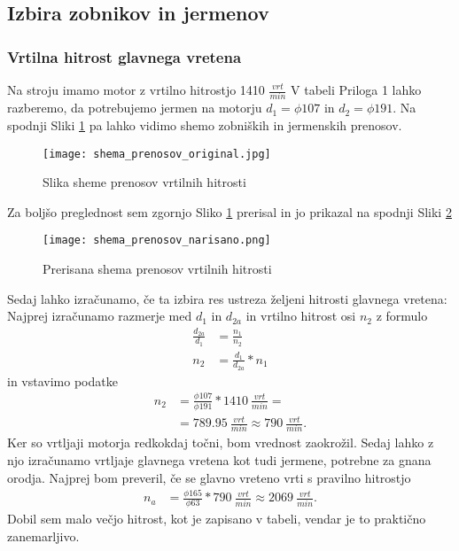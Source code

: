 \subsection{Izbira zobnikov in jermenov}
\subsubsection{Vrtilna hitrost glavnega vretena}
Na stroju imamo motor z vrtilno hitrostjo 1410 \( \frac{vrt}{min} \)
V tabeli Priloga 1 lahko razberemo, da potrebujemo jermen na motorju
\( d_1 = \phi 107 \) in \( d_2 = \phi 191 \).
Na spodnji Sliki \ref{slika_prenosov} pa lahko vidimo shemo
zobniških in jermenskih prenosov.

\begin{figure}[H]
	\begin{center}
		\texttt{[image: shema\_prenosov\_original.jpg]}
		\caption{Slika sheme prenosov vrtilnih hitrosti
			\cite{gauthier}}
		\label{slika_prenosov}
	\end{center}
\end{figure}

Za boljšo preglednost sem zgornjo Sliko \ref{slika_prenosov}
prerisal in jo prikazal na spodnji Sliki \ref{skica_prenosov}

\begin{figure}[H]
	\begin{center}
		\texttt{[image: shema\_prenosov\_narisano.png]}
		\caption{Prerisana shema prenosov vrtilnih hitrosti
			\cite{lasten}}
		\label{skica_prenosov}
	\end{center}
\end{figure}

Sedaj lahko izračunamo, če ta izbira res ustreza željeni hitrosti glavnega vretena:
Najprej izračunamo razmerje med \( d_1 \) in \( d_{2a} \) in vrtilno hitrost osi \(n_2\)
z formulo
\begin{equation}
	\begin{split}
		\frac{d_{2a}}{d_1} &= \frac{n_1}{n_2} \\
		n_2 &= \frac{d_1}{d_{2a}} * n_1
	\end{split}
\end{equation}
in vstavimo podatke
\begin{equation*}
	\begin{split}
		n_2 &= \frac{\phi 107}{\phi 191} * 1410\ \frac{vrt}{min} = \\
		&= 789.95\ \frac{vrt}{min} \approx 790\ \frac{vrt}{min}.
	\end{split}
\end{equation*}
Ker so vrtljaji motorja redkokdaj točni, bom vrednost zaokrožil. Sedaj
lahko z njo izračunamo vrtljaje glavnega vretena kot tudi jermene,
potrebne za gnana orodja. Najprej bom preveril, če se glavno vreteno vrti s
pravilno hitrostjo
\begin{equation*}
	\begin{split}
		n_a &= \frac{\phi 165}{\phi 63} * 790\ \frac{vrt}{min} \approx 2069\ \frac{vrt}{min}.
	\end{split}
\end{equation*}
Dobil sem malo večjo hitrost, kot je zapisano v tabeli, vendar je to praktično zanemarljivo.

